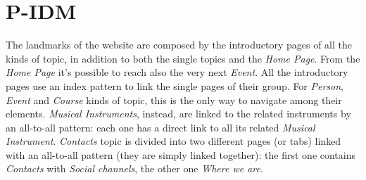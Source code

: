 \documentclass[../../DD.tex]{subfiles}
\begin{document}
\section{P-IDM}
	The landmarks of the website are composed by the introductory pages of all the kinds of topic, in addition to both the single topics and the \textit{Home Page}. From the \textit{Home Page} it's possible to reach also the very next \textit{Event}.
	\newline
	All the introductory pages use an index pattern to link the single pages of their group. For \textit{Person}, \textit{Event} and \textit{Course} kinds of topic, this is the only way to navigate among their elements. \textit{Musical Instruments}, instead, are linked to the related instruments by an all-to-all pattern: each one has a direct link to all its related \textit{Musical Instrument}.
	\newline
	\textit{Contacts} topic is divided into two different pages (or tabs) linked with an all-to-all pattern (they are simply linked together): the first one contains \textit{Contacts} with \textit{Social channels}, the other one \textit{Where we are}.
	\newline
\end{document}
